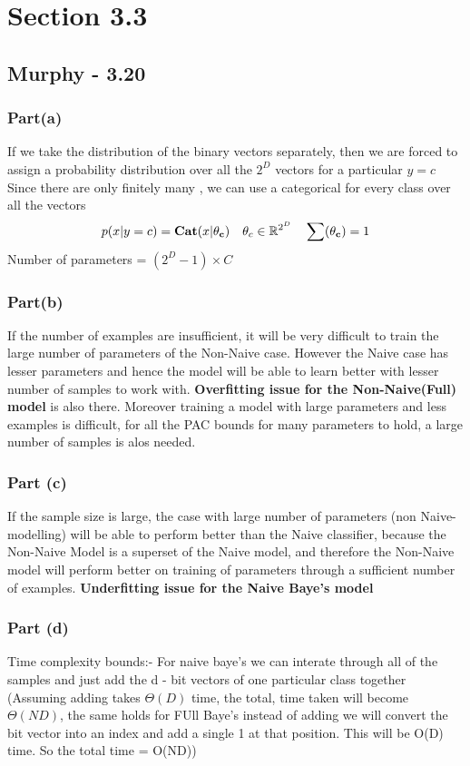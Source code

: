 \section{Section 3.3}

\subsection{Murphy - 3.20}
\subsubsection{Part(a)}
If we take the distribution of the binary vectors separately, then we are forced to assign a probability distribution over all the $2^D$ vectors for a particular $y = c$
Since there are only finitely many , we can use a categorical for every class over all the vectors
\begin{equation}
    p(x|y = c) =  \textbf{Cat}(x | \vb{\theta_c}) \ \ \ \theta_c \in \mathbb{R}^{2^D}  \ \ \ \sum(\vb{\theta_c}) = 1
\end{equation}
Number of parameters = $(2^D - 1) \times C$
\subsubsection{Part(b)}
If the number of examples are insufficient, it will be very difficult to train the large number of parameters of the Non-Naive case. However the Naive case has lesser parameters and hence the model will be able to learn better with lesser number of samples to work with.
\textbf{Overfitting issue for the Non-Naive(Full) model} is also there. Moreover training a model with large parameters and less 
examples is difficult, for all the PAC bounds for many parameters to hold, a large number of samples is alos needed.\


\subsubsection{Part (c)}
If the sample size is large, the case with large number of parameters (non Naive- modelling) will be able to perform better than the Naive classifier, because the Non-Naive Model is a superset of the Naive model, and therefore the Non-Naive model will perform better on training of parameters through a sufficient number of examples.
\textbf{Underfitting issue for the Naive Baye's model }

\subsubsection{Part (d)}
Time complexity bounds:-
For naive baye's we can interate through all of the samples and just add the d - bit vectors of one particular class together
(Assuming adding takes $\Theta(D)$ time, the total, time taken will become $ \Theta(ND)$, the same holds for FUll Baye's instead of adding we will convert the 
bit vector into an index and add a single 1 at that position. This will be O(D) time. So the total time = O(ND))


